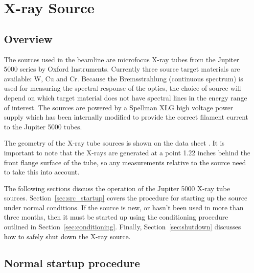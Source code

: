 \chapter{X-ray Source}

\section{Overview}

The sources used in the beamline are microfocus X-ray tubes from the Jupiter
5000 series by Oxford Instruments. Currently three source target materials are
available: W, Cu and Cr. Because the Bremsstrahlung (continuous
spectrum) is used for measuring the spectral response of the optics, the choice
of source will depend on which target material does not have spectral lines in
the energy range of interest. The sources are powered by a Spellman XLG high
voltage power supply \cite{generator_manual} which has been internally modified
to provide the correct filament current to the Jupiter 5000 tubes.

The geometry of the X-ray tube sources is shown on the data sheet
\cite{tube_data_sheet}. It is important to note that the X-rays are generated at
a point 1.22 inches behind the front flange surface of the tube, so any
measurements relative to the source need to take this into account.

The following sections discuss the operation of the Jupiter 5000 X-ray tube
sources. Section~\ref{sec:src_startup} covers the procedure for starting up the
source under normal conditions. If the source is new, or hasn't been used in
more than three months, then it must be started up using the conditioning
procedure outlined in Section~\ref{sec:conditioning}. Finally,
Section~\ref{sec:shutdown} discusses how to safely shut down the X-ray source.


\section{Normal startup procedure\label{sec:src_startup}}

